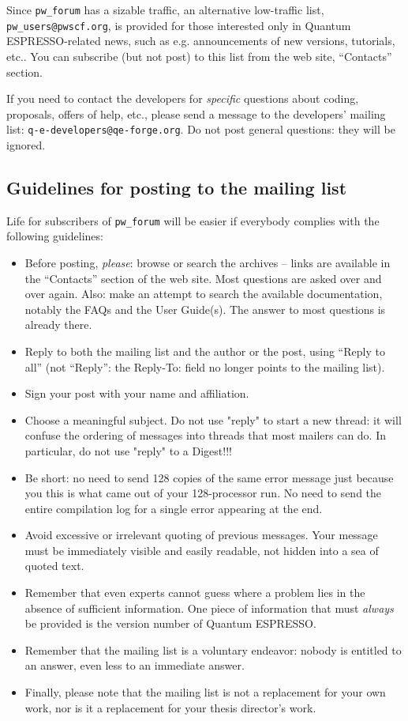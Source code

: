 \documentclass[12pt,a4paper]{article}
\def\qe{{\sc Quantum ESPRESSO}}
\begin{document}
Since \texttt{pw\_forum} has a sizable traffic, an alternative
low-traffic list, \texttt{pw\_users@pwscf.org}, is provided for
those interested only in \qe-related news, such as e.g. announcements 
of new versions, tutorials, etc.. You can subscribe (but not post) to 
this list from the web site, ``Contacts'' section.

If you need to contact the developers for {\em specific} questions 
about coding, proposals, offers of help, etc., please send a message
to the developers' mailing list: \texttt{q-e-developers@qe-forge.org}.
Do not post general questions: they will be ignored.

\subsection{Guidelines for posting to the mailing list}
\label{SubSec:Guidelines}
Life for subscribers of \texttt{pw\_forum} will be easier if everybody 
complies with the following guidelines:
\begin{itemize}
\item Before posting, {\em please}: browse or search the archives -- 
  links are available in the ``Contacts'' section  of the   web site.
  Most questions are asked over and over again. Also: make an attempt
  to search the
  available documentation, notably the FAQs and the User Guide(s).
  The answer to most questions is already there.
\item Reply to both the mailing list and the author or the post, using 
  ``Reply to all'' (not ``Reply'': the Reply-To: field no longer points
   to the mailing list).
\item Sign your post with your name and affiliation.
\item Choose a meaningful subject. Do not use "reply" to start a new
  thread:
  it will confuse the ordering of messages into threads that most mailers
  can do. In particular, do not use "reply" to a Digest!!!
\item Be short: no need to send 128 copies of the same error message just
  because you this is what came out of your 128-processor run. No need to
  send the entire compilation log for a single error appearing at the end.
\item Avoid excessive or irrelevant quoting of previous messages. Your
  message must be immediately visible and easily readable, not hidden
  into a sea of quoted text.
\item Remember that even experts cannot guess where a problem lies in
  the absence of sufficient information. One piece of information that
  must {\em always} be provided is the version number of \qe.
\item Remember that the mailing list is a voluntary endeavor: nobody is 
  entitled to an answer, even less to an immediate answer.
\item Finally, please note that the mailing list is not a replacement
  for your own work, nor is it a replacement for your thesis director's 
  work.
\end{itemize}
 
\end{document}
